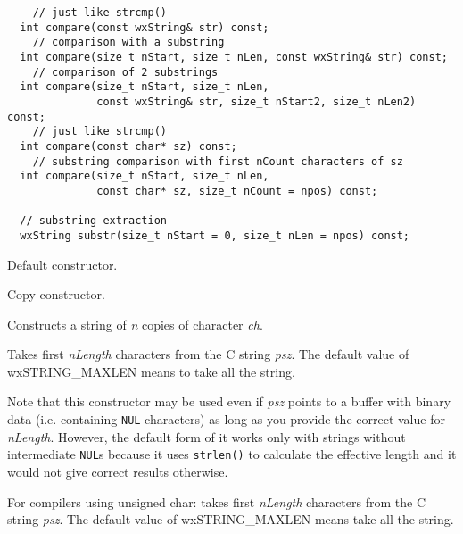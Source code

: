 \begin{verbatim}
    // just like strcmp()
  int compare(const wxString& str) const;
    // comparison with a substring
  int compare(size_t nStart, size_t nLen, const wxString& str) const;
    // comparison of 2 substrings
  int compare(size_t nStart, size_t nLen,
              const wxString& str, size_t nStart2, size_t nLen2) const;
    // just like strcmp()
  int compare(const char* sz) const;
    // substring comparison with first nCount characters of sz
  int compare(size_t nStart, size_t nLen,
              const char* sz, size_t nCount = npos) const;

  // substring extraction
  wxString substr(size_t nStart = 0, size_t nLen = npos) const;
\end{verbatim}


\label{wxstringconstruct}


Default constructor.


Copy constructor.


Constructs a string of {\it n} copies of character {\it ch}.


Takes first {\it nLength} characters from the C string {\it psz}.
The default value of wxSTRING\_MAXLEN means to take all the string.

Note that this constructor may be used even if {\it psz} points to a buffer
with binary data (i.e. containing {\tt NUL} characters) as long as you provide
the correct value for {\it nLength}. However, the default form of it works
only with strings without intermediate {\tt NUL}s because it uses 
{\tt strlen()} to calculate the effective length and it would not give correct
results otherwise.


For compilers using unsigned char: takes first {\it nLength} characters from the C string {\it psz}.
The default value of wxSTRING\_MAXLEN means take all the string.

